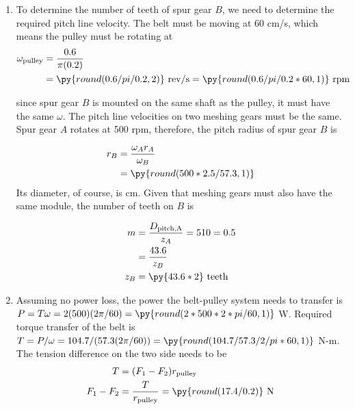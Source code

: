\documentclass[
10pt,
a4paper,
openany,
svgnames,
]{book}
\begin{document}
\begin{solution}

  \begin{enumerate}
    \item To determine the number of teeth of spur gear $B$, we need to determine the required pitch line velocity. The belt must be moving at 60 cm/s, which means the pulley must be rotating at
          \begin{align*}
            \omega_{\text{pulley}} &= \frac{0.6}{\pi (0.2)} \\
                                   &= \py{round(0.6/pi/0.2,2)} \text{ rev/s} = \py{round(0.6/pi/0.2*60,1)} \text{ rpm}
          \end{align*}

          since spur gear $B$ is mounted on the same shaft as the pulley, it must have the same $\omega$. The pitch line velocities on two meshing gears must be the same. Spur gear $A$ rotates at 500 rpm, therefore, the pitch radius of spur gear $B$ is

          \begin{align*}
            r_{B} &= \frac{\omega_{A} r_{A}}{\omega_{B}} \\
                       &= \py{round(500*2.5/57.3,1)}
          \end{align*}
          Its diameter, of course, is  cm. Given that meshing gears must also have the same module, the number of teeth on $B$ is

          \begin{align*}
            m &= \frac{D_{\text{pitch,A}}}{z_{A}} = {5}{10} = 0.5 \\
              &= \frac{43.6}{z_{B}} \\
            z_{B} &= \py{43.6*2} \text{ teeth}
          \end{align*}

    \item Assuming no power loss, the power the belt-pulley system needs to transfer is $P = T\omega = 2(500)(2\pi/60) = \py{round(2*500*2*pi/60,1)}$ W. Required torque transfer of the belt is $T = P/\omega = 104.7/(57.3(2\pi/60)) = \py{round(104.7/57.3/2/pi*60,1)}$ N-m. The tension difference on the two side needs to be
          \begin{align*}
            T &= (F_{1} - F_{2})r_{\text{pulley}} \\
            F_{1} - F_{2} &= \frac{T}{r_{\text{pulley}}} = \py{round(17.4/0.2)} \text{ N}
          \end{align*}


\end{enumerate}
\end{solution}
\end{document}
